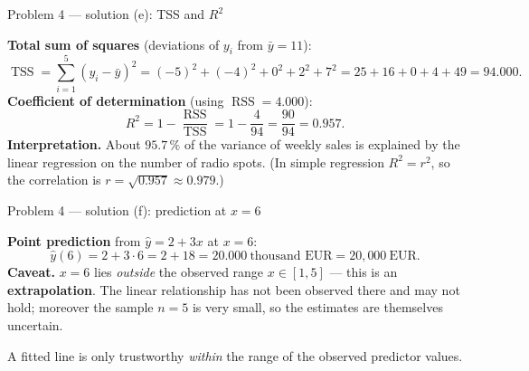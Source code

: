 \documentclass[aspectratio=169,11pt]{beamer}
\begin{document}
\begin{frame}{Problem 4 --- solution (e): TSS and $R^2$}
  \begin{solutionbox}
    \textbf{Total sum of squares} (deviations of $y_i$ from $\bar y=11$):
    \[
      \operatorname{TSS}=\sum_{i=1}^{5}(y_i-\bar y)^2
      =(-5)^2+(-4)^2+0^2+2^2+7^2 = 25+16+0+4+49 = 94.000.
    \]
    \textbf{Coefficient of determination} (using $\operatorname{RSS}=4.000$):
    \[
      R^2=1-\frac{\operatorname{RSS}}{\operatorname{TSS}}=1-\frac{4}{94}=\frac{90}{94}=0.957.
    \]
    \textbf{Interpretation.} About $95.7\,\%$ of the variance of weekly sales is explained by the
    linear regression on the number of radio spots. (In simple regression $R^2=r^2$, so the
    correlation is $r=\sqrt{0.957}\approx 0.979$.)
  \end{solutionbox}
\end{frame}

\begin{frame}{Problem 4 --- solution (f): prediction at $x=6$}
  \begin{solutionbox}
    \textbf{Point prediction} from $\hat y=2+3x$ at $x=6$:
    \[
      \hat y(6)=2+3\cdot 6 = 2+18 = 20.000 \ \text{thousand EUR} = 20{,}000\ \text{EUR}.
    \]
    \textbf{Caveat.} $x=6$ lies \emph{outside} the observed range $x\in[1,5]$ --- this is an
    \textbf{extrapolation}. The linear relationship has not been observed there and may not hold;
    moreover the sample $n=5$ is very small, so the estimates are themselves uncertain.
  \end{solutionbox}
  \begin{takeaway}
    A fitted line is only trustworthy \emph{within} the range of the observed predictor values.
  \end{takeaway}
\end{frame}
\end{document}
